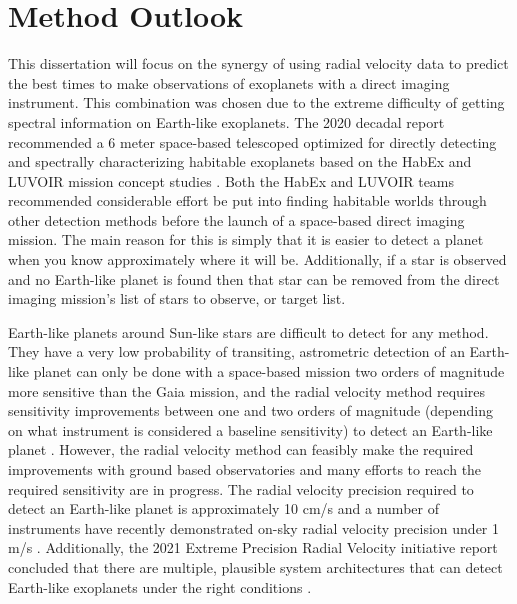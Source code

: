 \section{Method Outlook}
\label{sec:EPRV_HWO}

This dissertation will focus on the synergy of using radial velocity data to
predict the best times to make observations of exoplanets with a direct imaging
instrument. This combination was chosen due to the extreme difficulty of
getting spectral information on Earth-like exoplanets. The 2020 decadal report
recommended a 6 meter space-based telescoped optimized for directly detecting
and spectrally characterizing habitable exoplanets
\citep{nationalacademiesofsciencesPathwaysDiscoveryAstronomy2021} based on the
HabEx and LUVOIR mission concept studies
\citep{gaudiHabitableExoplanetObservatory2020,TheLUVOIRTeam2019}. Both the
HabEx and LUVOIR teams recommended considerable effort be put into finding
habitable worlds through other detection methods before the launch of a
space-based direct imaging mission. The main reason for this is simply that it
is easier to detect a planet when you know approximately where it will be.
Additionally, if a star is observed and no Earth-like planet is found then that
star can be removed from the direct imaging mission's list of stars to observe,
or target list. 

Earth-like planets around Sun-like stars are difficult to detect for any
method. They have a very low probability of transiting, astrometric detection
of an Earth-like planet can only be done with a space-based mission two orders
of magnitude more sensitive than the Gaia mission, and the radial velocity
method requires sensitivity improvements between one and two orders of
magnitude (depending on what instrument is considered a baseline sensitivity)
to detect an Earth-like planet \citep{gaudiHabitableExoplanetObservatory2020}.
However, the radial velocity method can feasibly make the required improvements
with ground based observatories and many efforts to reach the required
sensitivity are in progress\citep{Fischer2016a}. The radial velocity precision
required to detect an Earth-like planet is approximately 10 cm/s and a number
of instruments have recently demonstrated on-sky radial velocity precision
under 1 m/s \citep{maroonx2021, guptaTargetPrioritization2021,Pepe2021}.
Additionally, the 2021 Extreme Precision Radial Velocity initiative report
concluded that there are multiple, plausible system architectures that can
detect Earth-like exoplanets under the right conditions \citep{Crass2021}.

